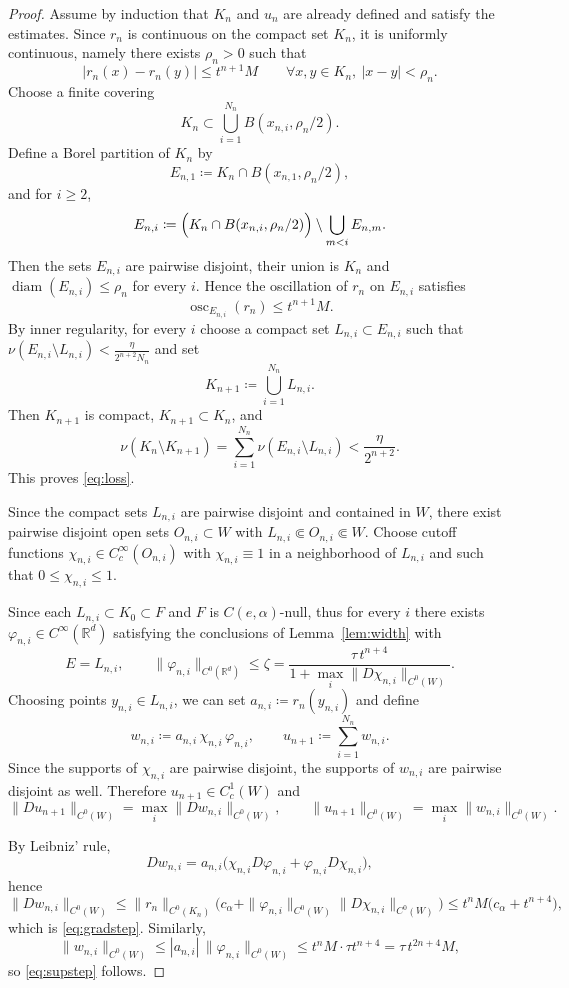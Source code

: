\documentclass[10pt,a4paper]{amsart}
\newcommand{\R}{\mathbb{R}}
\newcommand{\diam}{\operatorname{diam}}
\newcommand{\osc}{\operatorname{osc}}
\begin{document}
\begin{proof}
Assume by induction that $K_n$ and $u_n$ are already defined and satisfy the estimates.
Since $r_n$ is continuous on the compact set $K_n$, it is uniformly continuous, namely there exists $\rho_n>0$ such that
$$
|r_n(x)-r_n(y)|\le t^{n+1}M
\qquad\forall x,y\in K_n,\ |x-y|<\rho_n.
$$
Choose a finite covering
$$
K_n\subset \bigcup_{i=1}^{N_n} B(x_{n,i},\rho_n/2).
$$
Define a Borel partition of $K_n$ by
$$
E_{n,1}\coloneqq K_n\cap B(x_{n,1},\rho_n/2),
$$
and for $i\ge 2$,
$$
E_{n,i}\coloneqq \Bigl(K_n\cap B(x_{n,i},\rho_n/2)\Bigr)\setminus \bigcup_{m<i}E_{n,m}.
$$
Then the sets $E_{n,i}$ are pairwise disjoint, their union is $K_n$ and $\diam(E_{n,i})\leq \rho_n$ for every $i$.
Hence the oscillation of $r_n$ on $E_{n,i}$ satisfies
$$
\osc_{E_{n,i}}(r_n)\le t^{n+1}M.
$$
By inner regularity, for every $i$ choose a compact set $L_{n,i}\subset E_{n,i}$ such that $\nu(E_{n,i}\setminus L_{n,i})<\frac{\eta}{2^{n+2}N_n}$ and set
$$
K_{n+1}\coloneqq \bigcup_{i=1}^{N_n}L_{n,i}.
$$
Then $K_{n+1}$ is compact, $K_{n+1}\subset K_n$, and
$$
\nu(K_n\setminus K_{n+1})
=\sum_{i=1}^{N_n}\nu(E_{n,i}\setminus L_{n,i})
< \frac{\eta}{2^{n+2}}.
$$
This proves \eqref{eq:loss}.

Since the compact sets $L_{n,i}$ are pairwise disjoint and contained in $W$, there exist pairwise disjoint open sets $O_{n,i}\subset W$ with $L_{n,i}\Subset O_{n,i}\Subset W$.
Choose cutoff functions $\chi_{n,i}\in C^\infty_c(O_{n,i})$ with $\chi_{n,i}\equiv 1$ in a neighborhood of $L_{n,i}$ and such that $0\le \chi_{n,i}\le 1$.

Since each $L_{n,i}\subset K_0\subset F$ and $F$ is $C(e,\alpha)$-null,
thus for every $i$ there exists $\varphi_{n,i}\in C^\infty(\R^d)$ satisfying the conclusions of Lemma~\ref{lem:width} with
$$
E=L_{n,i},
\qquad
\|\varphi_{n,i}\|_{C^0(\mathbb{R}^d)}
\leq
\zeta
=\dfrac{\tau\,t^{n+4}}{1+\max_i \|D\chi_{n,i}\|_{C^0(W)}} .
$$
Choosing points $y_{n,i}\in L_{n,i}$, we can set $a_{n,i}\coloneqq r_n(y_{n,i})$ and define
$$
w_{n,i}\coloneqq a_{n,i}\,\chi_{n,i}\,\varphi_{n,i},
\qquad
u_{n+1}\coloneqq \sum_{i=1}^{N_n}w_{n,i}.
$$
Since the supports of $\chi_{n,i}$ are pairwise disjoint, the supports of $w_{n,i}$ are pairwise disjoint as well.
Therefore $u_{n+1}\in C^1_c(W)$ and
$$
\|Du_{n+1}\|_{C^0(W)} = \max_i \|Dw_{n,i}\|_{C^0(W)},
\qquad
\|u_{n+1}\|_{C^0(W)} = \max_i \|w_{n,i}\|_{C^0(W)}.
$$

By Leibniz' rule,
$$
Dw_{n,i}=a_{n,i}\bigl(\chi_{n,i}D\varphi_{n,i}+\varphi_{n,i}D\chi_{n,i}\bigr),
$$
hence
$$
\|Dw_{n,i}\|_{C^0(W)}
\le \|r_n\|_{C^0(K_n)}\bigl(c_\alpha+\|\varphi_{n,i}\|_{C^0(W)} \|D\chi_{n,i}\|_{C^0(W)}\bigr)
\le t^{n}M\bigl(c_\alpha+t^{n+4}\bigr),
$$
which is \eqref{eq:gradstep}.
Similarly,
$$
\|w_{n,i}\|_{C^0(W)}
\le |a_{n,i}|\,\|\varphi_{n,i}\|_{C^0(W)}
\le t^{n}M\cdot \tau t^{n+4}
= \tau\,t^{2n+4}M,
$$
so \eqref{eq:supstep} follows.


\end{proof}
\end{document}

